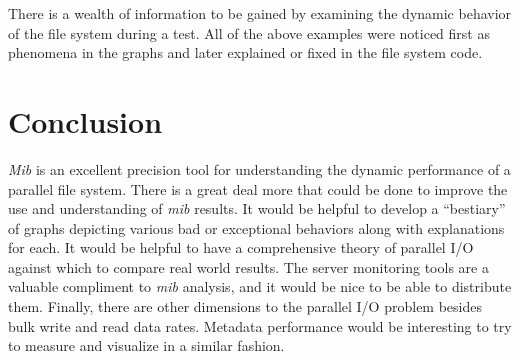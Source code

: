 \documentclass{article}
\begin{document}
There is a wealth of information to be gained by examining the dynamic
behavior of the file system during a test.  All of the above examples
were noticed first as phenomena in the graphs and later explained or
fixed in the file system code.  


\section{Conclusion}\label{section.conclusion}

{\em Mib} is an excellent precision tool for understanding the dynamic
performance of a parallel file system.  There is a great deal more
that could be done to improve the use and understanding of {\em mib}
results.  It would be helpful to develop a ``bestiary'' of graphs
depicting various bad or exceptional behaviors along with explanations
for each.  It would be helpful to have a comprehensive theory of
parallel I/O against which to compare real world results.  The server
monitoring tools are a valuable compliment to {\em mib} analysis, and
it would be nice to be able to distribute them.  Finally, there are
other dimensions to the parallel I/O problem besides bulk write and
read data rates.  Metadata performance would be interesting to try to
measure and visualize in a similar fashion.
\end{document}
